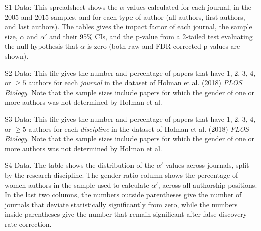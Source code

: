 \documentclass[12pt,]{article}
\begin{document}
S1 Data: This spreadsheet shows the \(\alpha\) values calculated for
each journal, in the 2005 and 2015 samples, and for each type of author
(all authors, first authors, and last authors). The tables gives the
impact factor of each journal, the sample size, \(\alpha\) and
\(\alpha'\) and their 95\% CIs, and the p-value from a 2-tailed test
evaluating the null hypothesis that \(\alpha\) is zero (both raw and
FDR-corrected p-values are shown).

S2 Data: This file gives the number and percentage of papers that have
1, 2, 3, 4, or \({\ge}5\) authors for each \emph{journal} in the dataset
of Holman et al. (2018) \emph{PLOS Biology}. Note that the sample sizes
include papers for which the gender of one or more authors was not
determined by Holman et al.

S3 Data: This file gives the number and percentage of papers that have
1, 2, 3, 4, or \({\ge}5\) authors for each \emph{discipline} in the
dataset of Holman et al. (2018) \emph{PLOS Biology}. Note that the
sample sizes include papers for which the gender of one or more authors
was not determined by Holman et al.

S4 Data. The table shows the distribution of the \(\alpha'\) values
across journals, split by the research discipline. The gender ratio
column shows the percentage of women authors in the sample used to
calculate \(\alpha'\), across all authorship positions. In the last two
columns, the numbers outside parentheses give the number of journals
that deviate statistically significantly from zero, while the numbers
inside parentheses give the number that remain significant after false
discovery rate correction.
\end{document}
